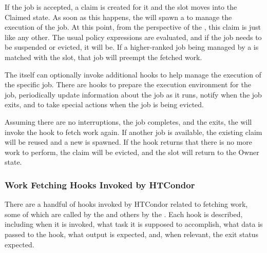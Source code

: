 If the job is accepted, a claim is created for it and the slot moves
into the Claimed state.
As soon as this happens, the  will spawn a
 to manage the execution of the job.
At this point, from the perspective of the , this claim
is just like any other.
The usual policy expressions are evaluated, and if the job needs to be
suspended or evicted, it will be.
If a higher-ranked job being managed by a  is matched
with the slot, that job will preempt the fetched work.

The  itself can optionally invoke additional hooks to
help manage the execution of the specific job.
There are hooks to prepare the execution environment for the job,
periodically update information about the job as it runs, notify when
the job exits, and to take special actions when the job is being evicted.

Assuming there are no interruptions, the job completes, and the
 exits, the  will invoke the hook to
fetch work again.
If another job is available, the existing claim will be reused and a
new  is spawned.
If the hook returns that there is no more work to perform, the claim
will be evicted, and the slot will return to the Owner state.


\subsubsection{\label{sec:job-hooks-hooks}
Work Fetching Hooks Invoked by HTCondor}

There are a handful of hooks invoked by HTCondor related to fetching
work, some of which are called by the  and others by
the .
Each hook is described, including when it is invoked, what
task it is supposed to accomplish, what data is passed to the hook,
what output is expected, and, when relevant, the exit status expected.


